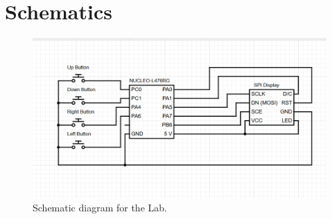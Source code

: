 \section{Schematics}
\label{sec:schematic}


\begin{figure}[h!]
    \centering
    \includegraphics[scale= 0.5]{images/schematic.png}
    \caption{Schematic diagram for the Lab.}
    \label{fig:schematic}
\end{figure}
